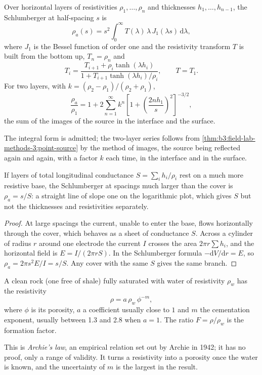 \begin{proposition}\label{prop:b3:field-lab-methods-3:layers}
Over horizontal layers of resistivities $\rho_1, \dots, \rho_n$ and
thicknesses $h_1, \dots, h_{n-1}$, the Schlumberger  at half-spacing $s$ is
\[
\rho_a(s) = s^2\int_0^\infty T(\lambda)\,\lambda\,J_1(\lambda s)\,\mathrm{d}\lambda ,
\]
where $J_1$ is the Bessel function of order one and the resistivity
transform $T$ is built from the bottom up, $T_n = \rho_n$ and
\[
T_i = \frac{T_{i+1} + \rho_i\tanh(\lambda h_i)}{1 + T_{i+1}\tanh(\lambda h_i)/\rho_i} ,
\qquad T = T_1 .
\]
For two layers, with $k = (\rho_2 - \rho_1)/(\rho_2 + \rho_1)$,
\[
\frac{\rho_a}{\rho_1} = 1 + 2\sum_{n=1}^{\infty} k^n
  \left[1 + \left(\frac{2nh_1}{s}\right)^2\right]^{-3/2} ,
\]
the sum of the images of the source in the interface and the surface.
\end{proposition}
The integral form is admitted; the two-layer series follows from
\cref{thm:b3:field-lab-methods-3:point-source} by the method of images,
the source being reflected again and again, with a factor $k$ each
time, in the interface and in the surface.

\begin{proposition}\label{prop:b3:field-lab-methods-3:conductance}
If layers of total longitudinal conductance $S = \sum_i h_i/\rho_i$ rest
on a much more resistive base, the Schlumberger  at
spacings much larger than the cover is $\rho_a = s/S$: a straight line
of slope one on the logarithmic plot, which gives $S$ but not the
thicknesses and resistivities separately.
\end{proposition}

\begin{proof}
At large spacings the current, unable to enter the base, flows
horizontally through the cover, which behaves as a sheet of
conductance $S$. Across a cylinder of radius $r$ around one electrode
the current $I$ crosses the area $2\pi r\sum h_i$, and the horizontal
field is $E = I/(2\pi rS)$. In the Schlumberger formula $-\mathrm{d}V/
\mathrm{d}r = E$, so $\rho_a = 2\pi s^2 E/I = s/S$. Any cover with the
same $S$ gives the same branch.
\end{proof}

\begin{proposition}\label{prop:b3:field-lab-methods-3:archie}
A clean rock (one free of shale) fully saturated with water of
resistivity $\rho_w$ has the resistivity
\[
\rho = a\,\rho_w\,\phi^{-m} ,
\]
where $\phi$ is its porosity, $a$ a coefficient usually close to $1$
and $m$ the cementation exponent, usually between \num{1.3} and
\num{2.8} when $a = 1$. The ratio $F = \rho/\rho_w$ is the formation
factor.
\end{proposition}
This is \emph{Archie's law}, an empirical relation
set out by Archie in 1942; it has no proof, only a range of validity. It turns a resistivity into a porosity once the water is
known, and the uncertainty of $m$ is the largest in the result.

